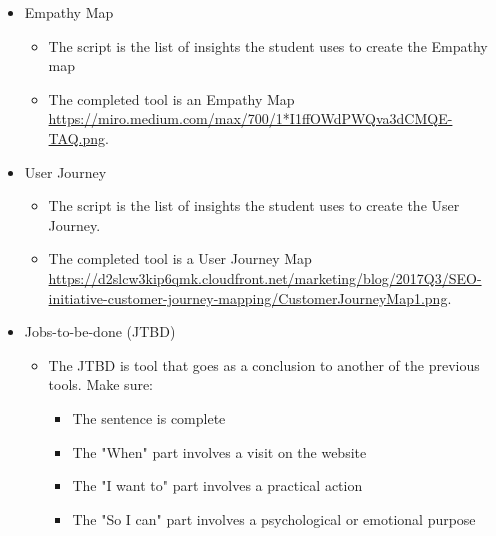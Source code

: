 \begin{itemize}
\item Empathy Map
\begin{itemize}
\item The script is the list of insights the student uses to create the Empathy map
\item The completed tool is an Empathy Map \url{https://miro.medium.com/max/700/1*I1ffOWdPWQva3dCMQE-TAQ.png}.
\end{itemize}
\end{itemize}

\begin{itemize}
\item User Journey
\begin{itemize}
\item The script is the list of insights the student uses to create the User Journey.
\item The completed tool is a User Journey Map \url{https://d2slcw3kip6qmk.cloudfront.net/marketing/blog/2017Q3/SEO-initiative-customer-journey-mapping/CustomerJourneyMap1.png}.
\end{itemize}
\end{itemize}

\begin{itemize}
\item Jobs-to-be-done (JTBD)
\begin{itemize}
\item The JTBD is tool that goes as a conclusion to another of the previous tools. Make sure:
\begin{itemize}
\item The sentence is complete
\item The "When" part involves a visit on the website
\item The "I want to" part involves a practical action
\item The "So I can" part involves a psychological or emotional purpose
\end{itemize}
\end{itemize}
\end{itemize}


